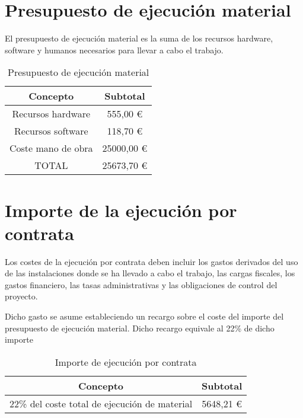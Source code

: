 \section{Presupuesto de ejecución material}
\label{sec:presupuesto-material}

El presupuesto de ejecución material es la suma de los recursos hardware, software y humanos necesarios para llevar a cabo el trabajo.

\begin{table}[H]
\centering
\begin{tabular}{|c|c|}
\hline
Concepto           & Subtotal \\ \hline
Recursos hardware  & 555,00 \euro        \\ \hline
Recursos software  & 118,70 \euro        \\ \hline
Coste mano de obra & 25000,00 \euro        \\ \hline
TOTAL              & 25673,70 \euro        \\ \hline
\end{tabular}
\caption{Presupuesto de ejecución material}
\label{tab:ejec_material}
\end{table}

\section{Importe de la ejecución por contrata}
\label{sec:presupuesto-ejecucion}

Los costes de la ejecución por contrata deben incluir los gastos derivados del uso de las instalaciones donde se ha llevado a cabo el trabajo, las cargas fiscales, los gastos financiero, las tasas administrativas y las obligaciones de control del proyecto.

Dicho gasto se asume estableciendo un recargo sobre el coste del importe del presupuesto de ejecución material. Dicho recargo equivale al 22\% de dicho importe

\begin{table}[H]
\centering
\begin{tabular}{|c|c|}
\hline
Concepto                                      & Subtotal \\ \hline
22\% del coste total de ejecución de material & 5648,21 \euro       \\ \hline
\end{tabular}
\caption{Importe de ejecución por contrata}
\label{tab:ejec_contrata}
\end{table}


